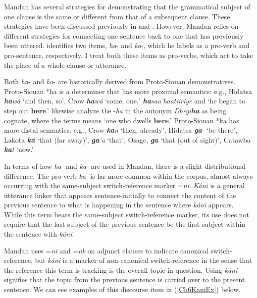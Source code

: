 Mandan has several strategies for demonstrating that the grammatical subject of one clause is the same or different from that of a subsequent clause. These strategies have been discussed previously in  and . However, Mandan relies on different strategies for connecting one sentence back to one that has previously been uttered. \citet[57]{mixco1997a} identifies two items, \textit{ha}- and \textit{ka}-, which he labels as a pro-verb and pro-sentence, respectively. I treat both these items as pro-verbs, which act to take the place of a whole clause or utterance.

Both \textit{ha}- and \textit{ka}- are historically derived from Proto-Siouan demonstratives. Proto-Siouan *ha is a determiner that has more proximal semantics: e.g., Hidatsa \textit{\textbf{ha}wá} `and then, so', Crow \textit{\textbf{ha}wá} ‘some, one,’ \textit{\textbf{ha}saa'haatiiriye} and `he began to step out \textbf{here}.' \citet{rankin2015} likewise analyze the -\textit{ha} in the autonym \textit{Dhegi\textbf{ha}} as being cognate, where the terms means `one who dwells \textbf{here}.' Proto-Siouan *ka has more distal semantics: e.g., Crow \textit{\textbf{ka}n} `then, already', Hidatsa \textit{\textbf{ga}}- `be there', Lakota \textit{\textbf{ká}} `that (far away)', \textit{\textbf{ga}'a} `that', Osage, \textit{\textbf{ga}} `that (out of sight)', Catawba \textit{\textbf{ka}t} `now.'

In terms of how \textit{ha}- and \textit{ka}- are used in Mandan, there is a slight distributional difference. The pro-verb \textit{ka}- is far more common within the corpus, almost always occurring with the same-subject switch-reference marker =\textit{ni}. \textit{Káni} is a general utterance linker that appears sentence-initially to connect the content of the previous sentence to what is happening in the sentence where \textit{káni} appears. While this term bears the same-subject switch-reference marker, its use does not require that the last subject of the previous sentence be the first subject within the sentence with \textit{káni}. 

Mandan uses =\textit{ni} and =\textit{ak} on adjunct clauses to indicate canonical switch-reference, but \textit{káni} is a marker of non-canonical switch-reference in the sense that the reference this term is tracking is the overall topic in question. Using \textit{káni} signifies that the topic from the previous sentence is carried over to the present sentence. We can see examples of this discourse item in (\ref{Ch6KaniEx}) below.

